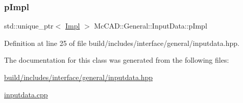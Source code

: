 \subsubsection{\texorpdfstring{p\+Impl}{pImpl}}
{\footnotesize\ttfamily std\+::unique\+\_\+ptr$<$ \hyperlink{classMcCAD_1_1General_1_1InputData_1_1Impl}{Impl} $>$ Mc\+C\+A\+D\+::\+General\+::\+Input\+Data\+::p\+Impl\hspace{0.3cm}{\ttfamily [private]}}



Definition at line 25 of file build/includes/interface/general/inputdata.\+hpp.



The documentation for this class was generated from the following files\+:\begin{DoxyCompactItemize}
\item 
\hyperlink{build_2includes_2interface_2general_2inputdata_8hpp}{build/includes/interface/general/inputdata.\+hpp}\item 
\hyperlink{inputdata_8cpp}{inputdata.\+cpp}\end{DoxyCompactItemize}
